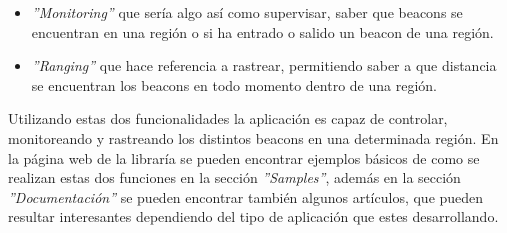 \begin{itemize}
\item \textit{''Monitoring''} que sería algo así como supervisar, saber que beacons se encuentran en una región o si ha entrado o salido un beacon de una región.
\item \textit{''Ranging''} que hace referencia a rastrear, permitiendo saber a que distancia se encuentran los beacons en todo momento dentro de una región.
\end{itemize}

Utilizando estas dos funcionalidades la aplicación es capaz de controlar, monitoreando y rastreando los distintos beacons en una determinada región. En la página web de la libraría se pueden encontrar ejemplos básicos de como se realizan estas dos funciones en la sección \textit{''Samples''}, además en la sección \textit{''Documentación''} se pueden encontrar también algunos artículos, que pueden resultar interesantes dependiendo del tipo de aplicación que estes desarrollando.




